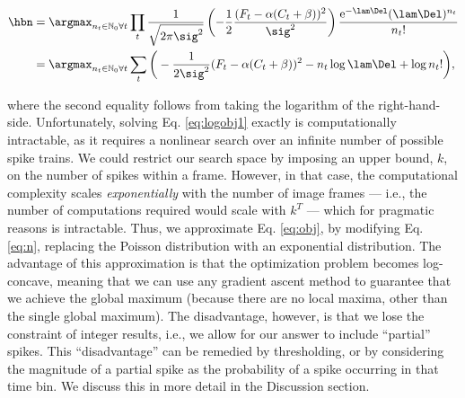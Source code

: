\begin{subequations}  \label{eq:obj}
\begin{align}
\hbn 	&= \anx \prod_t \frac{1}{\sqrt{2 \pi \sig^2}} \left(-\frac{1}{2}\frac{(F_t - \alpha (C_t + \beta))^2}{\sig^2}\right) \frac{\text{e}^{-\lam\Del} (\lam\Del)^{n_t}}{n_t!}
%
%
\label{eq:obj1}\\ &= \anx  \sum_t \bigg( -\frac{1}{2 \sig^2}(F_t - \alpha(C_t + \beta))^2  -  n_t \log \lam \Del + \log n_t! \bigg), \label{eq:logobj1}
\end{align} 
\end{subequations}

\noindent where the second equality follows from taking the logarithm of the right-hand-side.  Unfortunately, solving Eq. \eqref{eq:logobj1} exactly is computationally intractable, as it requires a nonlinear search over an infinite number of  possible spike trains.  We could restrict our search space by imposing an upper bound, $k$, on the number of spikes within a frame.  However, in that case, the computational complexity scales \emph{exponentially} with the number of image frames --- i.e., the number of computations required would scale with $k^T$ --- which for pragmatic reasons is intractable.  Thus, we approximate Eq. \eqref{eq:obj}, by modifying Eq. \eqref{eq:n}, replacing the Poisson distribution with an exponential distribution.  The advantage of this approximation is that the optimization problem becomes log-concave, meaning that we can use any gradient ascent method to guarantee that we achieve the global maximum (because there are no local maxima, other than the single global maximum).  The disadvantage, however, is that we lose the constraint of integer results, i.e., we allow for our answer to include ``partial'' spikes.  This ``disadvantage'' can be remedied by thresholding, or by considering the magnitude of a partial spike as the probability of a spike occurring in that time bin.  We discuss this in more detail in the Discussion section. 

